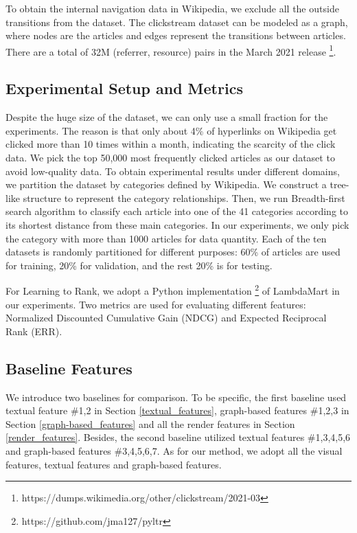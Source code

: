 To obtain the internal navigation data in Wikipedia, we exclude all the outside transitions from the dataset. The clickstream dataset can be modeled as a graph, where nodes are the articles and edges represent the transitions between articles. There are a total of 32M (referrer, resource) pairs in the March 2021 release \footnote{https://dumps.wikimedia.org/other/clickstream/2021-03}.

\subsection{Experimental Setup and Metrics}

Despite the huge size of the dataset, we can only use a small fraction for the experiments. The reason is that only about 4\% of hyperlinks on Wikipedia get clicked more than 10 times within a month, indicating the scarcity of the click data. We pick the top 50,000 most frequently clicked articles as our dataset to avoid low-quality data. To obtain experimental results under different domains, we partition the dataset by categories defined by Wikipedia. We construct a tree-like structure to represent the category relationships. Then, we run Breadth-first search algorithm to classify each article into one of the 41 categories according to its shortest distance from these main categories. In our experiments, we only pick the category with more than 1000 articles for data quantity. Each of the ten datasets is randomly partitioned for different purposes: 60\% of articles are used for training, 20\% for validation, and the rest 20\% is for testing.

For Learning to Rank, we adopt a Python implementation \footnote{https://github.com/jma127/pyltr} of LambdaMart \cite{wu2010adapting} in our experiments. Two metrics are used for evaluating different features: Normalized Discounted Cumulative Gain (NDCG) and Expected Reciprocal Rank (ERR).

\subsection{Baseline Features}

We introduce two baselines \cite{thruesen2016link, dimitrov2017makes} for comparison. To be specific, the first baseline \cite{dimitrov2017makes} used textual feature \#1,2 in Section \ref{textual_features}, graph-based features \#1,2,3 in Section \ref{graph-based_features} and all the render features in Section \ref{render_features}. Besides, the second baseline \cite{thruesen2016link} utilized textual features \#1,3,4,5,6 and graph-based features \#3,4,5,6,7. As for our method, we adopt all the visual features, textual features and graph-based features.

